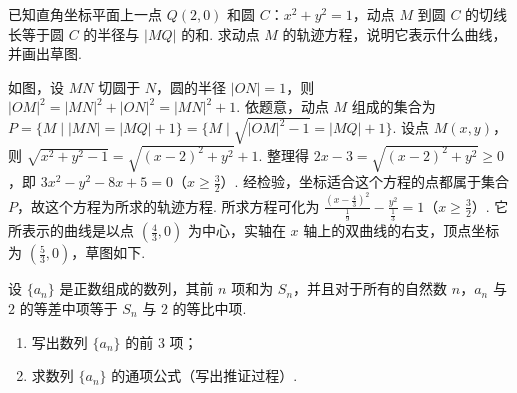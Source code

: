 \begin{problem}
已知直角坐标平面上一点 \(Q(2, 0)\) 和圆 \(C\)：\(x^2 + y^2 = 1\)，动点 \(M\) 到圆 \(C\) 的切线长等于圆 \(C\) 的半径与 \(|MQ|\) 的和. 求动点 \(M\) 的轨迹方程，说明它表示什么曲线，并画出草图.

\end{problem}

\begin{solution}
如图，设 \(MN\) 切圆于 \(N\)，圆的半径 \(|ON| = 1\)，则 \(|OM|^2 = |MN|^2 + |ON|^2 = |MN|^2 + 1\). 依题意，动点 \(M\) 组成的集合为 \(P = \{M \mid |MN| = |MQ| + 1\} = \{M \mid \sqrt{|OM|^2 - 1} = |MQ| + 1\}\). 设点 \(M(x, y)\)，则 \(\sqrt{x^2 + y^2 - 1} = \sqrt{(x - 2)^2 + y^2} + 1\). 整理得 \(2x - 3 = \sqrt{(x - 2)^2 + y^2} \geqslant 0\)，即 \(3x^2 - y^2 - 8x + 5 = 0\)（\(x \geqslant \frac{3}{2}\)）. 经检验，坐标适合这个方程的点都属于集合 \(P\)，故这个方程为所求的轨迹方程. 所求方程可化为 \(\frac{\left(x - \frac{4}{3}\right)^2}{\frac{1}{9}} - \frac{y^2}{\frac{1}{3}} = 1\)（\(x \geqslant \frac{3}{2}\)）. 它所表示的曲线是以点 \(\left(\frac{4}{3}, 0\right)\) 为中心，实轴在 \(x\) 轴上的双曲线的右支，顶点坐标为 \(\left(\frac{5}{3}, 0\right)\)，草图如下.
\end{solution}

\begin{problem}
设 \(\{a_n\}\) 是正数组成的数列，其前 \(n\) 项和为 \(S_n\)，并且对于所有的自然数 \(n\)，\(a_n\) 与 \(2\) 的等差中项等于 \(S_n\) 与 \(2\) 的等比中项.

\begin{enumerate}
\item 写出数列 \(\{a_n\}\) 的前 \(3\) 项；
\item 求数列 \(\{a_n\}\) 的通项公式（写出推证过程）.
\end{enumerate}
\end{problem}

